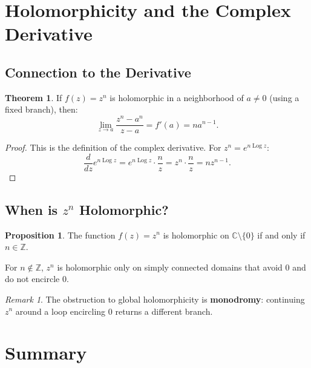 \documentclass{article}
\theoremstyle{definition}
\newtheorem{theorem}{Theorem}[section]
\newtheorem{proposition}{Proposition}[section]
\theoremstyle{remark}
\newtheorem{remark}{Remark}[section]
\newcommand{\C}{\mathbb{C}}
\newcommand{\Z}{\mathbb{Z}}
\newcommand{\Log}{\operatorname{Log}}
\begin{document}
\section{Holomorphicity and the Complex Derivative}

\subsection{Connection to the Derivative}

\begin{theorem}
If $f(z) = z^n$ is holomorphic in a neighborhood of $a \neq 0$ (using a fixed branch), then:
\begin{equation}
\lim_{z \to a} \frac{z^n - a^n}{z - a} = f'(a) = n a^{n-1}.
\end{equation}
\end{theorem}

\begin{proof}
This is the definition of the complex derivative. For $z^n = e^{n \Log z}$:
\begin{equation}
\frac{d}{dz} e^{n \Log z} = e^{n \Log z} \cdot \frac{n}{z} = z^n \cdot \frac{n}{z} = n z^{n-1}.
\end{equation}
\end{proof}

\subsection{When is $z^n$ Holomorphic?}

\begin{proposition}
The function $f(z) = z^n$ is holomorphic on $\C \setminus \{0\}$ if and only if $n \in \Z$.

For $n \notin \Z$, $z^n$ is holomorphic only on simply connected domains that avoid $0$ and do not encircle $0$.
\end{proposition}

\begin{remark}
The obstruction to global holomorphicity is \textbf{monodromy}: continuing $z^n$ around a loop encircling $0$ returns a different branch.
\end{remark}

\section{Summary}
\end{document}
